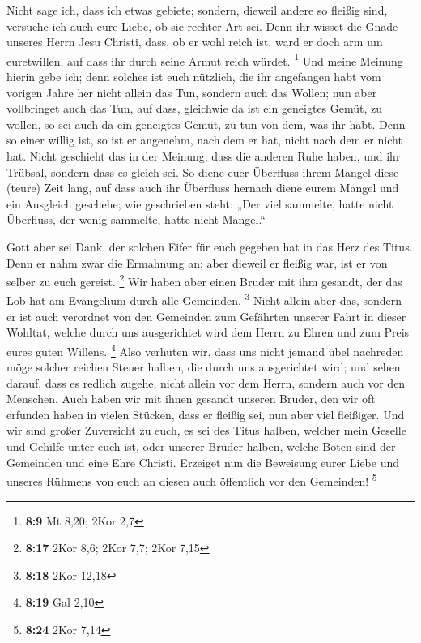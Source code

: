  Nicht sage ich, dass ich etwas gebiete; sondern, dieweil
andere so fleißig sind, versuche ich auch eure Liebe, ob sie rechter Art
sei.  Denn ihr wisset die Gnade unseres Herrn Jesu Christi,
dass, ob er wohl reich ist, ward er doch arm um euretwillen, auf dass
ihr durch seine Armut reich würdet. \footnote{\textbf{8:9} Mt 8,20; 2Kor
  2,7}  Und meine Meinung hierin gebe ich; denn solches ist
euch nützlich, die ihr angefangen habt vom vorigen Jahre her nicht
allein das Tun, sondern auch das Wollen;  nun aber
vollbringet auch das Tun, auf dass, gleichwie da ist ein geneigtes
Gemüt, zu wollen, so sei auch da ein geneigtes Gemüt, zu tun von dem,
was ihr habt.  Denn so einer willig ist, so ist er
angenehm, nach dem er hat, nicht nach dem er nicht hat. 
Nicht geschieht das in der Meinung, dass die anderen Ruhe haben, und ihr
Trübsal, sondern dass es gleich sei.  So diene euer
Überfluss ihrem Mangel diese (teure) Zeit lang, auf dass auch ihr
Überfluss hernach diene eurem Mangel und ein Ausgleich geschehe;
 wie geschrieben steht: „Der viel sammelte, hatte nicht
Überfluss, der wenig sammelte, hatte nicht Mangel.``

 Gott aber sei Dank, der solchen Eifer für euch gegeben hat
in das Herz des Titus.  Denn er nahm zwar die Ermahnung an;
aber dieweil er fleißig war, ist er von selber zu euch gereist.
\footnote{\textbf{8:17} 2Kor 8,6; 2Kor 7,7; 2Kor 7,15}  Wir
haben aber einen Bruder mit ihm gesandt, der das Lob hat am Evangelium
durch alle Gemeinden. \footnote{\textbf{8:18} 2Kor 12,18} 
Nicht allein aber das, sondern er ist auch verordnet von den Gemeinden
zum Gefährten unserer Fahrt in dieser Wohltat, welche durch uns
ausgerichtet wird dem Herrn zu Ehren und zum Preis eures guten Willens.
\footnote{\textbf{8:19} Gal 2,10}  Also verhüten wir, dass
uns nicht jemand übel nachreden möge solcher reichen Steuer halben, die
durch uns ausgerichtet wird;  und sehen darauf, dass es
redlich zugehe, nicht allein vor dem Herrn, sondern auch vor den
Menschen.  Auch haben wir mit ihnen gesandt unseren Bruder,
den wir oft erfunden haben in vielen Stücken, dass er fleißig sei, nun
aber viel fleißiger.  Und wir sind großer Zuversicht zu
euch, es sei des Titus halben, welcher mein Geselle und Gehilfe unter
euch ist, oder unserer Brüder halben, welche Boten sind der Gemeinden
und eine Ehre Christi.  Erzeiget nun die Beweisung eurer
Liebe und unseres Rühmens von euch an diesen auch öffentlich vor den
Gemeinden! \footnote{\textbf{8:24} 2Kor 7,14}

